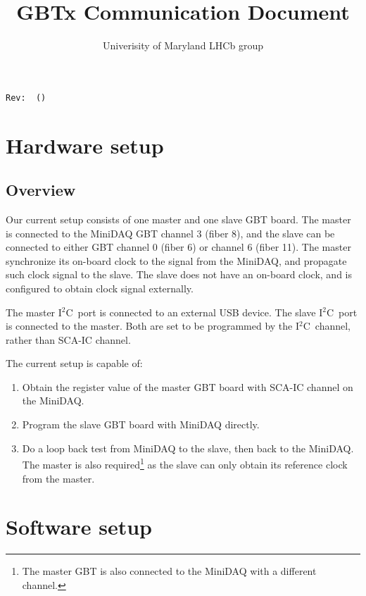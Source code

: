 \documentclass[11pt,letterpaper]{refart}
\title{GBTx Communication Document}
\author{Univerisity of Maryland LHCb group}
\def\itwoc{I{$\scriptstyle^2$}C\ }
\begin{document}
\maketitle
\hfill\small{\texttt{Rev:~\gitVtags \gitAbbrevHash~(\gitAuthorDate)}}
\tableofcontents
\clearpage

\section{Hardware setup}
\subsection{Overview}
Our current setup consists of one master and one slave GBT board.
The master is connected to the MiniDAQ GBT channel 3 (fiber 8),
and the slave can be connected to either GBT channel 0 (fiber 6) or channel 6
(fiber 11).
The master synchronize its on-board clock to the signal from the MiniDAQ,
and propagate such clock signal to the slave.
The slave does not have an on-board clock,
and is configured to obtain clock signal externally.

The master \itwoc port is connected to an external USB device.
The slave \itwoc port is connected to the master.
Both are set to be programmed by the \itwoc channel,
rather than SCA-IC channel.

The current setup is capable of:
\begin{enumerate}
    \item Obtain the register value of the master GBT board with SCA-IC channel
        on the MiniDAQ.
    \item Program the slave GBT board with MiniDAQ directly.
    \item Do a loop back test from MiniDAQ to the slave, then back to the
        MiniDAQ.
        The master is also required\footnote{
            The master GBT is also connected to the MiniDAQ with a different
        channel.}
        as the slave can only obtain its reference clock from the master.
\end{enumerate}


\section{Software setup}
\end{document}
